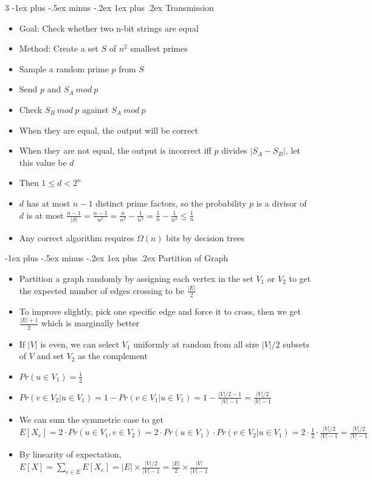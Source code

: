 \documentclass[10pt, landscape]{article}
\makeatletter
\renewcommand{\subsection}{\@startsection{subsection}{3}{0mm}%
                                {-1ex plus -.5ex minus -.2ex}%
                                {1ex plus .2ex}%
                                {\normalfont\small\bfseries}}%
\makeatother
\begin{document}
\begin{multicols*}{3}
\subsection{Transmission}
\begin{itemize}
    \item Goal: Check whether two n-bit strings are equal
    \item Method: Create a set $S$ of $n^2$ smallest primes
    \item Sample a random prime $p$ from $S$
    \item Send $p$ and $S_A\ mod\ p$
    \item Check $S_B\ mod\ p$ against $S_A\ mod\ p$
    \item When they are equal, the output will be correct
    \item When they are not equal, the output is incorrect iff $p$ divides $|S_A-S_B|$, let this value be $d$
    \item Then $1 \leq d < 2^n$
    \item $d$ has at most $n-1$ distinct prime factors, so the probability $p$ is a divisor of $d$ is at most $\frac{n-1}{|S|}=\frac{n-1}{n^2}=\frac{n}{n^2}-\frac{1}{n^2}=\frac{1}{n}-\frac{1}{n^2} \leq \frac{1}{n}$
    \item Any correct algorithm requires $\Omega(n)$ bits by decision trees
\end{itemize}

\subsection{Partition of Graph}
\begin{itemize}
    \item Partition a graph randomly by assigning each vertex in the set $V_1$ or $V_2$ to get the expected number of edges crossing to be $\frac{|E|}{2}$
    \item To improve slightly, pick one specific edge and force it to cross, then we get $\frac{|E|+1}{2}$ which is marginally better
    \item If $|V|$ is even, we can select $V_1$ uniformly at random from all size $|V|/2$ subsets of $V$ and set $V_2$ as the complement
    \item $Pr(u \in V_1)=\frac{1}{2}$
    \item $Pr(v \in V_2 | u \in V_1)=1-Pr(v \in V_1 | u \in V_1)=1-\frac{|V|/2-1}{|V|-1}=\frac{|V|/2}{|V|-1}$
    \item We can sum the symmetric case to get $E[X_e]=2\cdot Pr(u \in V_1, v \in V_2)=2\cdot Pr(u \in V_1)\cdot Pr(v \in V_2 | u \in V_1)=2 \cdot \frac{1}{2}\cdot \frac{|V|/2}{|V|-1}=\frac{|V|/2}{|V|-1}$
    \item By linearity of expectation, $E[X]=\sum_{e \in E}E[X_e]=|E| \times\frac{|V|/2}{|V|-1}=\frac{|E|}{2}\times\frac{|V|}{|V|-1}$
\end{itemize}


\end{multicols*}
\end{document}
